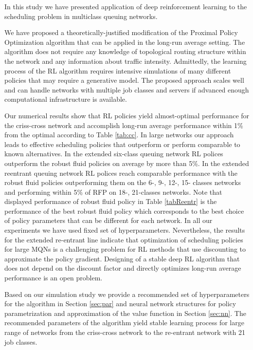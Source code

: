 \documentclass[11pt]{article}
\theoremstyle{definition}
\numberwithin{equation}{section}
\begin{document}
In this study we have presented application of
deep reinforcement learning to the scheduling problem in multiclass queuing networks.




We have  proposed a theoretically-justified modification of the Proximal Policy Optimization algorithm that can be applied in the long-run average setting.  The algorithm does not require any knowledge of  topological routing structure within the network and any information about traffic intensity. Admittedly, the learning process of the RL algorithm requires intensive simulations of many different policies that may require a generative model. The proposed approach scales well and can handle networks with multiple job classes and servers if advanced enough computational infrastructure is available.






Our numerical results show that  RL policies yield almost-optimal performance for the criss-cross network and accomplish  long-run average performance within 1\% from the optimal according to Table \ref{tab:cc}. In large networks our approach leads to effective scheduling policies that outperform or perform comparable to known alternatives. In the extended six-class queuing network RL polices  outperform  the robust fluid policies on average by more than  5\%. In the extended reentrant queuing network RL polices reach comparable performance with the robust fluid policies outperforming them on the 6-, 9-, 12-, 15- classes  networks  and performing within 5\% of
RFP on 18-, 21-classes networks. Note that displayed  performance of robust fluid policy in Table \ref{tabReentr} is the performance of the best  robust fluid policy which corresponds to the best choice of policy parameters that can be different for each network. In all our experiments we have used fixed set of hyperparameters.
Nevertheless, the results for the extended re-entrant line indicate that optimization of scheduling policies for large MQNs is a challenging problem for RL methods that use discounting to approximate the policy gradient. Designing of  a stable deep RL algorithm that does not depend on the discount factor and directly optimizes long-run average performance  is an open problem.


Based on our simulation study we  provide a recommended set of hyperparameters for the algorithm in Section \ref{sec:par}  and  neural network structures for policy parametrization and approximation of the value function in Section \ref{sec:nn}. The recommended parameters of the algorithm yield stable learning process for large range of networks from the criss-cross network to the re-entrant network with 21 job classes.
\end{document}
